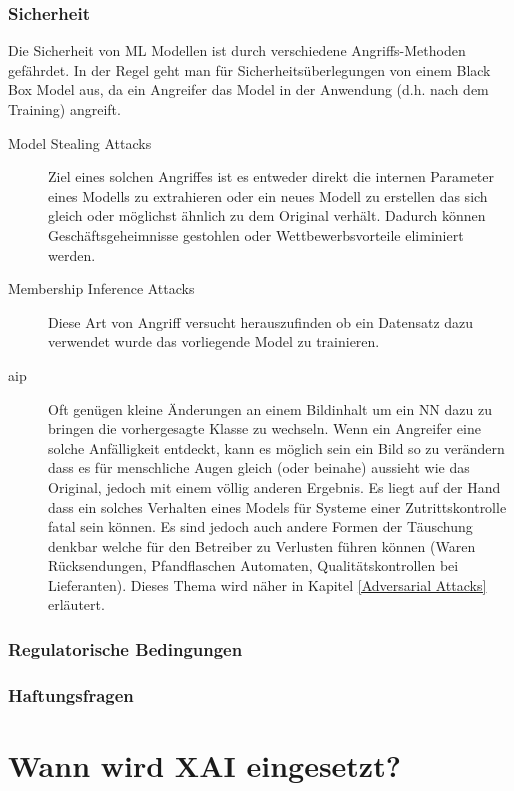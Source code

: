 \documentclass[
  12pt, %
  a4paper, %
  oneside, %
  openany, 
  numbers=noenddot, %
  BCOR=5mm, %
  parskip=half*, %
  thesis, %
]{bfhbook}
\begin{document}
\subsection{Sicherheit}
\label{Sicherheit}
Die Sicherheit von \Gls{ML} Modellen ist durch verschiedene Angriffs-Methoden gefährdet. In der Regel geht man für Sicherheitsüberlegungen von einem \Gls{Black Box} Model aus, da ein Angreifer das Model in der Anwendung (d.h. nach dem Training) angreift.
\begin{description}
	\item[Model Stealing Attacks] Ziel eines solchen Angriffes ist es entweder direkt die internen Parameter eines Modells zu extrahieren oder ein neues Modell zu erstellen das sich gleich oder möglichst ähnlich zu dem Original verhält. Dadurch können Geschäftsgeheimnisse gestohlen oder Wettbewerbsvorteile eliminiert werden.
	\item[Membership Inference Attacks] Diese Art von Angriff versucht herauszufinden ob ein Datensatz dazu verwendet wurde das vorliegende Model zu trainieren.
	\item[\acrfull{aip}] Oft genügen kleine Änderungen an einem Bildinhalt um ein \Gls{NN} dazu zu bringen die vorhergesagte Klasse zu wechseln. Wenn ein Angreifer eine solche Anfälligkeit entdeckt, kann es möglich sein ein Bild so zu verändern dass es für menschliche Augen gleich (oder beinahe) aussieht wie das Original, jedoch mit einem völlig anderen Ergebnis. Es liegt auf der Hand dass ein solches Verhalten eines Models für Systeme einer Zutrittskontrolle fatal sein können. Es sind jedoch auch andere Formen der Täuschung denkbar welche für den Betreiber zu Verlusten führen können (Waren Rücksendungen, Pfandflaschen Automaten, Qualitätskontrollen bei Lieferanten). Dieses Thema wird näher in Kapitel \ref{Adversarial Attacks} erläutert.
\end{description}

\subsection{Regulatorische Bedingungen}

\subsection{Haftungsfragen}

\chapter{Wann wird XAI eingesetzt?}
\end{document}
